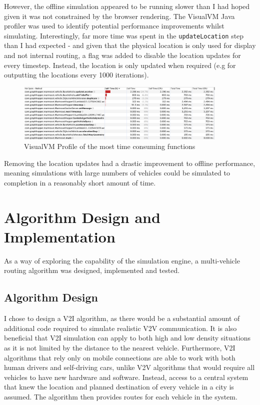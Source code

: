 \documentclass[ %
                    author={Alexander Hill},
                supervisor={Dr. Benjamin Sach},
                    degree={MEng},
                     title={MARMOSET},
                  subtitle={Multi-Agent Route Management using Online Simulation for Efficient Transportation},
                      type={research},
                      year={2016} ]{dissertation}
\begin{document}
However, the offline simulation appeared to be running slower than I had hoped
given it was not constrained by the browser rendering. The VisualVM Java
profiler was used to identify potential performance improvements whilst
simulating. Interestingly, far more time was spent in the
\texttt{updateLocation} step than I had expected - and given that the physical
location is only used for display and not internal routing, a flag was added to
disable the location updates for every timestep. Instead, the location is only
updated when required (e.g for outputting the locations every 1000 iterations).

\begin{figure}[h]
    \centering
    \includegraphics[width=0.9\textwidth,clip,trim=0 7cm 0 0]{visualvm-profile}
    \caption{VisualVM Profile of the most time consuming functions}\label{fig:visualvm}
\end{figure}

Removing the location updates had a drastic improvement to offline performance,
meaning simulations with large numbers of vehicles could be simulated to
completion in a reasonably short amount of time.

\section{Algorithm Design and Implementation}

As a way of exploring the capability of the simulation engine, a multi-vehicle
routing algorithm was designed, implemented and tested.

\subsection{Algorithm Design}\label{sec:algo}

I chose to design a V2I algorithm, as there would be a substantial amount of
additional code required to simulate realistic V2V communication. It is also
beneficial that V2I simulation can apply to both high and low density situations
as it is not limited by the distance to the nearest vehicle. Furthermore, V2I
algorithms that rely only on mobile connections are able to work with both human
drivers and self-driving cars, unlike V2V algorithms that would require all
vehicles to have new hardware and software.  Instead, access to a central system
that knew the location and planned destination of every vehicle in a city is
assumed. The algorithm then provides routes for each vehicle in the system.
\end{document}
